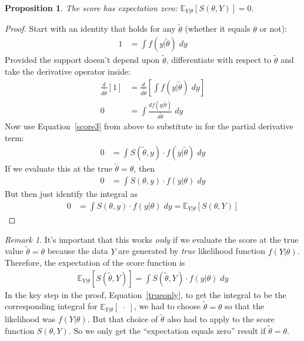 \documentclass[12pt]{article}
\theoremstyle{plain}
\newtheorem{prop}[thm]{Proposition}
\theoremstyle{definition}
\theoremstyle{remark}
\newtheorem*{rmk}{Remark}
\newcommand{\E}{\mathbb{E}}
\begin{document}
\begin{prop}
The score has expectation zero: $\E_{Y|\theta}[S(\theta,Y)]=0$.
\end{prop}
\begin{proof}
Start with an identity that holds for any $\tilde{\theta}$ (whether it
equals $\theta$ or not):
\begin{align*}
  1 &= \int f(y|\tilde{\theta}) \; dy
\end{align*}
Provided the support doesn't depend upon $\tilde{\theta}$, differentiate
with respect to $\tilde{\theta}$ and take the derivative operator
inside:
\begin{align*}
  \frac{d}{d\tilde{\theta}}
  [ 1 ]
  &=
  \frac{d}{d\tilde{\theta}}
  \left[
    \int f(y|\tilde{\theta}) \; dy
  \right] \\
  0
  &=
  \int \frac{df(y|\tilde{\theta})}{d\tilde{\theta}}  \; dy
\end{align*}
Now use Equation~\ref{score3} from above to substitute in for the
partial derivative term:
\begin{align}
  0 &= \int S(\tilde{\theta},y)\cdot f(y|\tilde{\theta}) \; dy
  \label{trueonly}
\end{align}
If we evaluate this at the true $\tilde{\theta}=\theta$, then
\begin{align*}
  0 &= \int S(\theta,y)\cdot f(y|\theta) \; dy
\end{align*}
But then just identify the integral as
\begin{align*}
  0 &= \int S(\theta,y)\cdot f(y|\theta) \; dy
  = \E_{Y|\theta}[S(\theta,Y)]
\end{align*}
\end{proof}
\begin{rmk}
It's important that this works \emph{only} if we evaluate the score at
the true value $\tilde{\theta}=\theta$ because the data $Y$ are
generated by \emph{true} likelihood function $f(Y|\theta)$. Therefore,
the expectation of the score function is
\begin{align*}
  \E_{Y|\theta}[S(\tilde{\theta},Y)]
  = \int S(\tilde{\theta},Y) \cdot f(y|\theta) \; dy
\end{align*}
In the key step in the proof, Equation~\ref{trueonly}, to get the
integral to be the corresponding integral for
$\E_{Y|\theta}[\;\cdot\;]$, we had to choose $\tilde{\theta}=\theta$ so
that the likelihood was $f(Y|\theta)$. But that choice of
$\tilde{\theta}$ also had to apply to the score function
$S(\theta,Y)$. So we only get the ``expectation equals zero'' result
if $\tilde{\theta}=\theta$.
\end{rmk}
\end{document}
